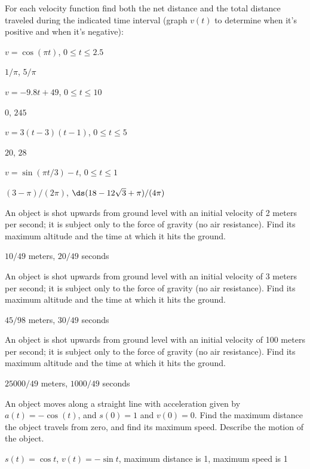 \begin{exercises}

For each velocity function find both the net distance and the total
distance traveled during the indicated time interval (graph $v(t)$ to
determine when it's positive and when it's negative): 

\exercise $v=\cos(\pi t)$, $0\le t\le 2.5$
\begin{answer} $1/\pi$, $5/\pi$
\end{answer}

\exercise $v=-9.8t+49$, $0\le t\le 10$
\begin{answer} $0$, $245$
\end{answer}

\exercise $v=3(t-3)(t-1)$, $0\le t\le 5$
\begin{answer} $20$, $28$
\end{answer}

\exercise $v=\sin(\pi t/3)-t$, $0\le t\le 1$
\begin{answer} $(3-\pi)/(2\pi)$, $\ds (18-12\sqrt3+\pi)/(4\pi)$
\end{answer}

\exercise An object is shot upwards from ground level with an initial
velocity of 2 meters per second; it is subject only to the force of
gravity (no air resistance). Find its maximum altitude and the time at
which it hits the ground.
\begin{answer} $10/49$ meters, $20/49$ seconds
\end{answer}

\exercise An object is shot upwards from ground level with an initial
velocity of 3 meters per second; it is subject only to the force of
gravity (no air resistance). Find its maximum altitude and the time at
which it hits the ground.
\begin{answer} $45/98$ meters, $30/49$ seconds
\end{answer}

\exercise An object is shot upwards from ground level with an initial
velocity of 100 meters per second; it is subject only to the force of
gravity (no air resistance). Find its maximum altitude and the time at
which it hits the ground.
\begin{answer} $25000/49$ meters, $1000/49$ seconds
\end{answer}

\exercise An object moves along a straight line with acceleration given by
$a(t) = -\cos(t)$, and $s(0)=1$ and
$v(0)=0$. Find the maximum distance the object travels from zero, and
find its maximum speed. Describe the motion of the object.
\begin{answer} $s(t)=\cos t$, $v(t)=-\sin t$,\hfill\break
maximum distance is 1,\hfill\break 
maximum speed is 1
\end{answer}


\end{exercises}
